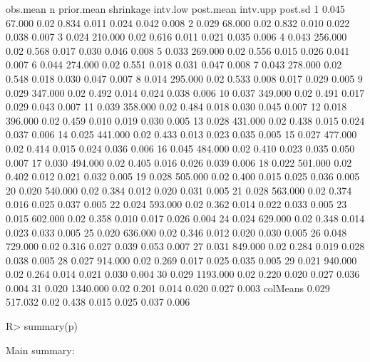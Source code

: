 \documentclass[article]{jss}
\begin{document}
\begin{CodeChunk}
\begin{CodeOutput}
         obs.mean        n prior.mean shrinkage intv.low post.mean intv.upp post.sd
1           0.045   67.000       0.02     0.834    0.011     0.024    0.042   0.008
2           0.029   68.000       0.02     0.832    0.010     0.022    0.038   0.007
3           0.024  210.000       0.02     0.616    0.011     0.021    0.035   0.006
4           0.043  256.000       0.02     0.568    0.017     0.030    0.046   0.008
5           0.033  269.000       0.02     0.556    0.015     0.026    0.041   0.007
6           0.044  274.000       0.02     0.551    0.018     0.031    0.047   0.008
7           0.043  278.000       0.02     0.548    0.018     0.030    0.047   0.007
8           0.014  295.000       0.02     0.533    0.008     0.017    0.029   0.005
9           0.029  347.000       0.02     0.492    0.014     0.024    0.038   0.006
10          0.037  349.000       0.02     0.491    0.017     0.029    0.043   0.007
11          0.039  358.000       0.02     0.484    0.018     0.030    0.045   0.007
12          0.018  396.000       0.02     0.459    0.010     0.019    0.030   0.005
13          0.028  431.000       0.02     0.438    0.015     0.024    0.037   0.006
14          0.025  441.000       0.02     0.433    0.013     0.023    0.035   0.005
15          0.027  477.000       0.02     0.414    0.015     0.024    0.036   0.006
16          0.045  484.000       0.02     0.410    0.023     0.035    0.050   0.007
17          0.030  494.000       0.02     0.405    0.016     0.026    0.039   0.006
18          0.022  501.000       0.02     0.402    0.012     0.021    0.032   0.005
19          0.028  505.000       0.02     0.400    0.015     0.025    0.036   0.005
20          0.020  540.000       0.02     0.384    0.012     0.020    0.031   0.005
21          0.028  563.000       0.02     0.374    0.016     0.025    0.037   0.005
22          0.024  593.000       0.02     0.362    0.014     0.022    0.033   0.005
23          0.015  602.000       0.02     0.358    0.010     0.017    0.026   0.004
24          0.024  629.000       0.02     0.348    0.014     0.023    0.033   0.005
25          0.020  636.000       0.02     0.346    0.012     0.020    0.030   0.005
26          0.048  729.000       0.02     0.316    0.027     0.039    0.053   0.007
27          0.031  849.000       0.02     0.284    0.019     0.028    0.038   0.005
28          0.027  914.000       0.02     0.269    0.017     0.025    0.035   0.005
29          0.021  940.000       0.02     0.264    0.014     0.021    0.030   0.004
30          0.029 1193.000       0.02     0.220    0.020     0.027    0.036   0.004
31          0.020 1340.000       0.02     0.201    0.014     0.020    0.027   0.003
colMeans    0.029  517.032       0.02     0.438    0.015     0.025    0.037   0.006
\end{CodeOutput}
\begin{CodeInput}
R> summary(p)
\end{CodeInput}
\begin{CodeOutput}
Main summary:


\end{CodeOutput}
\end{CodeChunk}
\end{document}
